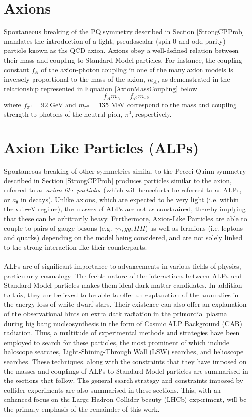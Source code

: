 \section{Axions}
Spontaneous breaking of the PQ symmetry described in Section \ref{StrongCPProb} mandates the introduction of a light, pseudoscalar (spin-0 and odd parity) particle known as the QCD axion. Axions obey a well-defined relation between their mass and coupling
to Standard Model particles. For instance, the coupling constant $f_{A}$ of the axion-photon coupling in one of the many axion models is inversely proportional to the mass of the axion, $m_{A}$, as demonstrated in the relationship represented in Equation \ref{AxionMassCoupling} below
\begin{equation}\label{AxionMassCoupling}
    f_{A}m_{A} = f_{\pi^{0}}m_{\pi^{0}}
\end{equation}
where $f_{\pi^{0}} = 92$ GeV and $m_{\pi^{0}} = 135$ MeV correspond to the mass and coupling strength to photons of the neutral pion, $\pi^{0}$, respectively.
\section{Axion Like Particles (ALPs)}
Spontaneous breaking of other symmetries similar to the Peccei-Quinn symmetry described in Section \ref{StrongCPProb} produces particles similar to the axion, referred to as \textit{axion-like particles} (which will henceforth be referred to as ALPs, or $a_{0}$ in decays). Unlike axions, which are expected to be very light (i.e. within the sub-eV regime), the masses of ALPs 
are not as constrained, thereby implying that these can be arbitrarily heavy. Furthermore, Axion-Like Particles are able to couple to pairs of
gauge bosons (e.g. $\gamma\gamma, gg, HH$) as well as fermions (i.e. leptons and quarks) depending on the model being considered, and are not solely linked to the strong interaction like their
counterparts. \\
\\
ALPs are of significant importance to advancements in various fields of physics, particularly cosmology. The feeble nature of the interactions between ALPs and Standard Model particles makes them ideal dark matter candidates. In addition to this, they
are believed to be able to offer an explanation of the anomalies in the energy loss of white dwarf stars. Their existence can also offer an explanation of the observational hints on extra dark radiation in the primordial plasma during big bang nucleosynthesis in the form
of Cosmic ALP Background (CAB) radiation. Thus, a multitude of experimental methods and strategies have been employed to search for these particles, the most prominent of which include haloscope searches, Light-Shining-Through Wall (LSW) searches, and helioscope searches. These
techniques, along with the constraints that they have imposed on the masses and couplings of ALPs to Standard Model particles are summarised in the sections that follow. The general search strategy and constraints imposed by collider experiments are also summarised in these sections. This, with an enhanced focus on the Large Hadron Collider beauty (LHCb) experiment,
will be the primary emphasis of the remainder of this work. 
